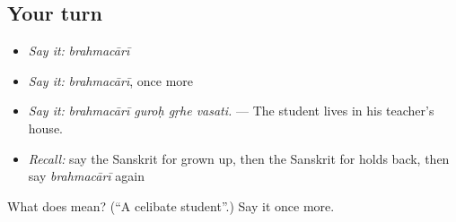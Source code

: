 \subsection*{Your turn}
\begin{itemize}
\raggedright
  \item \emph{Say it:} \emph{brahmacārī}
  \item \emph{Say it:} \emph{brahmacārī}, once more
  \item \emph{Say it:} \emph{brahmacārī guroḥ gṛhe vasati.} — The student lives in his teacher's house.
  \item \emph{Recall:} say the Sanskrit for grown up, then the Sanskrit for holds back, then say \emph{brahmacārī} again
\end{itemize}

\begin{tcolorbox}[breakable,colback=teal!4,colframe=teal!35!black,title={Before you move on}]
What does  mean? (\textquotedblleft{}A celibate student\textquotedblright{}.) Say it once more.
\end{tcolorbox}
